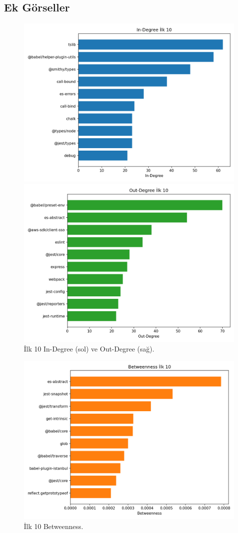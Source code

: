 \documentclass[11pt,a4paper]{article}
\begin{document}
\subsection{Ek Görseller}
\begin{figure}[h]
  \centering
  \includegraphics[width=0.48\linewidth]{top10_in_degree.png}

  \includegraphics[width=0.48\linewidth]{top10_out_degree.png}

  \caption{İlk 10 In-Degree (sol) ve Out-Degree (sağ).}
\end{figure}

\begin{figure}[h]
  \centering
  \includegraphics[width=0.6\linewidth]{top10_betweenness.png}

  \caption{İlk 10 Betweenness.}
\end{figure}
\end{document}
